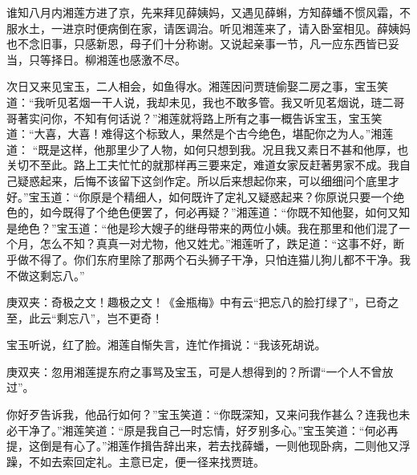 \begin{parag}
    谁知八月内湘莲方进了京，先来拜见薛姨妈，又遇见薛蝌，方知薛蟠不惯风霜，不服水土，一进京时便病倒在家，请医调治。听见湘莲来了，请入卧室相见。薛姨妈也不念旧事，只感新恩，母子们十分称谢。又说起亲事一节，凡一应东西皆已妥当，只等择日。柳湘莲也感激不尽。
\end{parag}


\begin{parag}
    次日又来见宝玉，二人相会，如鱼得水。湘莲因问贾琏偷娶二房之事，宝玉笑道：“我听见茗烟一干人说，我却未见，我也不敢多管。我又听见茗烟说，琏二哥哥著实问你，不知有何话说？”湘莲就将路上所有之事一概告诉宝玉，宝玉笑道：“大喜，大喜！难得这个标致人，果然是个古今绝色，堪配你之为人。”湘莲道： “既是这样，他那里少了人物，如何只想到我。况且我又素日不甚和他厚，也关切不至此。路上工夫忙忙的就那样再三要来定，难道女家反赶著男家不成。我自己疑惑起来，后悔不该留下这剑作定。所以后来想起你来，可以细细问个底里才好。”宝玉道：“你原是个精细人，如何既许了定礼又疑惑起来？你原说只要一个绝色的，如今既得了个绝色便罢了，何必再疑？”湘莲道：“你既不知他娶，如何又知是绝色？”宝玉道：“他是珍大嫂子的继母带来的两位小姨。我在那里和他们混了一个月，怎么不知？真真一对尤物，他又姓尤。”湘莲听了，跌足道：“这事不好，断乎做不得了。你们东府里除了那两个石头狮子干净，只怕连猫儿狗儿都不干净。我不做这剩忘八。”\begin{note}庚双夹：奇极之文！趣极之文！《金瓶梅》中有云“把忘八的脸打绿了”，已奇之至，此云“剩忘八”，岂不更奇！\end{note}宝玉听说，红了脸。湘莲自惭失言，连忙作揖说：“我该死胡说。\begin{note}庚双夹：忽用湘莲提东府之事骂及宝玉，可是人想得到的？所谓“一个人不曾放过”。\end{note}你好歹告诉我，他品行如何？”宝玉笑道：“你既深知，又来问我作甚么？连我也未必干净了。”湘莲笑道：“原是我自己一时忘情，好歹别多心。”宝玉笑道：“何必再提，这倒是有心了。”湘莲作揖告辞出来，若去找薛蟠，一则他现卧病，二则他又浮躁，不如去索回定礼。主意已定，便一径来找贾琏。
\end{parag}


